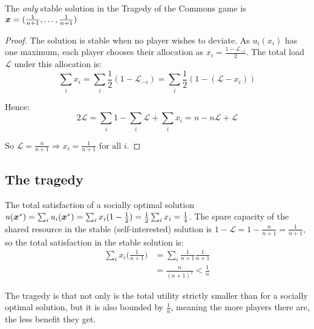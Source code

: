 \begin{claim}
	The \textit{only} stable solution in the Tragedy of the Commons game is
	$\bm{x} = (\frac{1}{n+1}, \ldots, \frac{1}{n+1})$
\end{claim}

\begin{proof}
	The solution is stable when no player wishes to deviate. As $u_i(x_i)$ has
	one maximum, each player chooses their allocation as $x_i = \frac{1 -
	\mathcal{L}_{-i}}{2}$. The total load $\mathcal{L}$ under this allocation
	is:
	\begin{equation*}
		\sum_i x_i = \sum_i \frac{1}{2}(1 - \mathcal{L}_{-i}) = \sum_i
		\frac{1}{2}(1 - (\mathcal{L} - x_i))
	\end{equation*}

	Hence:
	\begin{equation*}
		2 \mathcal{L} = \sum_i 1 - \sum_i \mathcal{L} + \sum_i x_i = n -
		n\mathcal{L} + \mathcal{L}
	\end{equation*}

	So $\mathcal{L} = \frac{n}{n+1} \Rightarrow x_i = \frac{1}{n+1} \text{ for
	all } i$.
\end{proof}

\subsection{The tragedy}

The total satisfaction of a socially optimal solution $u(\bm{x}^*) = \sum_i
u_i(\bm{x}^*) = \sum_i x_i (1 - \frac{1}{2}) = \frac{1}{2} \sum_i x_i =
\frac{1}{4}$.  The spare capacity of the shared resource in the stable
(self-interested) solution is $1 - \mathcal{L} = 1 - \frac{n}{n+1} =
\frac{1}{n+1}$, so the total satisfaction in the stable solution is:
\begin{equation}
	\begin{split}
		\sum_i x_i \bigg(\frac{1}{n+1} \bigg) & = \sum_i \frac{1}{n+1} \frac{1}{n+1} \\
		& = \frac{n}{(n+1)^2} < \frac{1}{n}
	\end{split}
\end{equation}

The tragedy is that not only is the total utility strictly smaller than for a
socially optimal solution, but it is also bounded by $\frac{1}{n}$, meaning the
more players there are, the less benefit they get.
